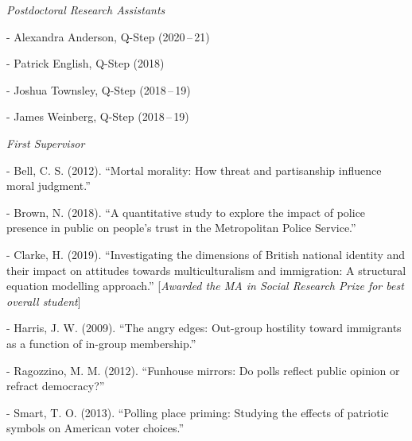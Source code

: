 \documentclass[12pt]{article}
\newcommand{\halfblankline}{\quad\vspace{-0.5\baselineskip}\pagebreak[3]}
\begin{document}
\halfblankline

\emph{Postdoctoral Research Assistants}
	\begin{innerlist}
		\item[-] Alexandra Anderson, Q-Step ({2020\,--\,21})
		\item[-] Patrick English, Q-Step ({2018})
		\item[-] Joshua Townsley, Q-Step ({2018\,--\,19})
		\item[-] James Weinberg, Q-Step ({2018\,--\,19})
	\end{innerlist}

\halfblankline

\emph{First Supervisor}
\begin{innerlist}
	\item[-] Bell, C. S. (2012). ``Mortal morality: 
                How threat and partisanship influence moral judgment.''
	\item[-] Brown, N. (2018). ``A quantitative study to explore the impact of police 
					presence in public on people's trust in the Metropolitan Police Service.''

	\item[-] Clarke, H. (2019). ``Investigating the dimensions of British national identity and their impact on attitudes towards multiculturalism and immigration: A structural equation modelling approach.'' [\textit{Awarded the MA in Social Research Prize for best overall student}]
                
	\item[-] Harris, J. W. (2009). ``The angry edges: Out-group
                         hostility toward immigrants as a function of in-group membership.''
	\item[-] Ragozzino, M. M. (2012). ``Funhouse mirrors: Do polls 
                        reflect public opinion or refract democracy?''
                        
	\item[-] Smart, T. O. (2013). ``Polling place priming: 
                Studying the effects of patriotic symbols on American voter choices.''
\end{innerlist}

\halfblankline
\end{document}
